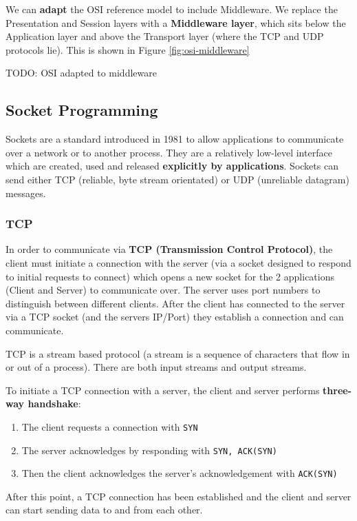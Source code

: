 \documentclass{article}
\begin{document}
We can \textbf{adapt} the OSI reference model to include Middleware. We replace the Presentation and Session layers with a \textbf{Middleware layer}, which sits below the Application layer and above the Transport layer (where the TCP and UDP protocols lie). This is shown in Figure \ref{fig:osi-middleware}

TODO: OSI adapted to middleware

\subsection{Socket Programming}

Sockets are a standard introduced in 1981 to allow applications to communicate over a network or to another process. They are a relatively low-level interface which are created, used and released \textbf{explicitly by applications}. Sockets can send either TCP (reliable, byte stream orientated) or UDP (unreliable datagram) messages. 

\subsubsection{TCP}

In order to communicate via \textbf{TCP (Transmission Control Protocol)}, the client must initiate a connection with the server (via a socket designed to respond to initial requests to connect) which opens a new socket for the 2 applications (Client and Server) to communicate over. The server uses port numbers to distinguish between different clients. After the client has connected to the server via a TCP socket (and the servers IP/Port) they establish a connection and can communicate.

TCP is a stream based protocol (a stream is a sequence of characters that flow in or out of a process). There are both input streams and output streams.

To initiate a TCP connection with a server, the client and server performs \textbf{three-way handshake}:
\begin{enumerate}
	\item The client requests a connection with \texttt{SYN}
	\item The server acknowledges by responding with \texttt{SYN, ACK(SYN)}
	\item Then the client acknowledges the server's acknowledgement with \texttt{ACK(SYN)}
\end{enumerate}
After this point, a TCP connection has been established and the client and server can start sending data to and from each other.
\end{document}
